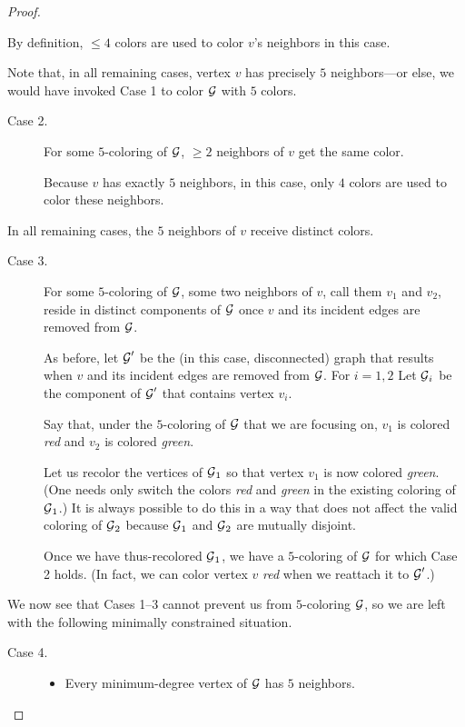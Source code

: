 {\begin{proof}
\begin{description}
\smallskip

By definition, $\leq 4$ colors are used to color $v$'s neighbors in
this case.
\end{description}
Note that, in all remaining cases, vertex $v$ has precisely $5$
neighbors---or else, we would have invoked Case 1 to color $\mbox{$\cal G$}$ with
$5$ colors.
\begin{description}
\item[{\sf Case 2}.]
For some $5$-coloring of $\mbox{$\cal G$}$, $\geq 2$ neighbors of $v$ get the same
color.

\smallskip

Because $v$ has exactly $5$ neighbors, in this case, only $4$ colors
are used to color these neighbors.
\end{description}
In all remaining cases, the $5$ neighbors of $v$ receive distinct
colors.
\begin{description}
\item[{\sf Case 3}.]
For some $5$-coloring of $\mbox{$\cal G$}$, some two neighbors of $v$, call them
$v_1$ and $v_2$, reside in distinct components of $\mbox{$\cal G$}$ once $v$ and
its incident edges are removed from $\mbox{$\cal G$}$.

\smallskip

As before, let $\mbox{$\cal G$}'$ be the (in this case, disconnected) graph that
results when $v$ and its incident edges are removed from $\mbox{$\cal G$}$.  For $i
= 1,2$ Let $\mbox{$\cal G$}_i$ be the component of $\mbox{$\cal G$}'$ that contains vertex $v_i$.

Say that, under the $5$-coloring of $\mbox{$\cal G$}$ that we are focusing on,
$v_1$ is colored {\it red} and $v_2$ is colored {\it green}.

Let us recolor the vertices of $\mbox{$\cal G$}_1$ so that vertex $v_1$ is now colored
{\it green}.  (One needs only switch the colors {\it red} and {\it
  green} in the existing coloring of $\mbox{$\cal G$}_1$.)  It is always possible
to do this in a way that does not affect the valid coloring of $\mbox{$\cal G$}_2$
because $\mbox{$\cal G$}_1$ and $\mbox{$\cal G$}_2$ are mutually disjoint.

Once we have thus-recolored $\mbox{$\cal G$}_1$, we have a $5$-coloring of $\mbox{$\cal G$}$ for
which Case 2 holds.  (In fact, we can color vertex $v$ {\em red} when we
reattach it to $\mbox{$\cal G$}'$.)
\end{description}

\noindent
We now see that Cases 1--3 cannot prevent us from $5$-coloring $\mbox{$\cal G$}$, so
we are left with the following minimally constrained situation.
\begin{description}
\item[{\sf Case 4}.]
\begin{itemize}
\item
Every minimum-degree vertex of $\mbox{$\cal G$}$ has $5$ neighbors.


\end{itemize}
\end{description}
\end{proof}}
